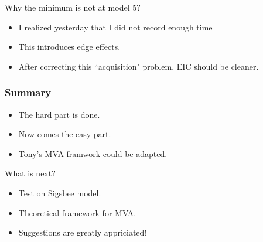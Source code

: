 \begin{frame}
Why the minimum is not at model 5? 
    \begin{itemize}
        \item I realized yesterday that I did not record enough time
        \item This introduces edge effects.
        \item After correcting this ``acquisition" problem, EIC should be cleaner.
    \end{itemize}
\end{frame}



\begin{frame} \frametitle{Summary}
    \begin{itemize}
        \item The hard part is done. 
        \item Now comes the easy part.
        \item Tony's MVA framwork could be adapted.
    \end{itemize}
\end{frame}

\begin{frame}
    What is next?
    \begin{itemize}
        \item Test on Sigsbee model.
        \item Theoretical framework for MVA.
        \item Suggestions are greatly appriciated!
    \end{itemize}
\end{frame}

